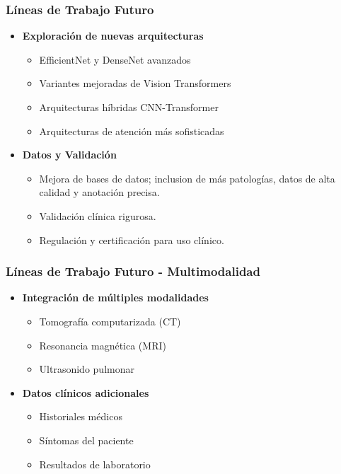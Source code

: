 \begin{frame}
\frametitle{Líneas de Trabajo Futuro}
\begin{itemize}
    \item \textbf{Exploración de nuevas arquitecturas}
    \begin{itemize}
        \item EfficientNet y DenseNet avanzados
        \item Variantes mejoradas de Vision Transformers
        \item Arquitecturas híbridas CNN-Transformer
        \item Arquitecturas de atención más sofisticadas
    \end{itemize}
    \item \textbf{Datos y Validación}
    \begin{itemize}
        \item Mejora de bases de datos; inclusion de más patologías, datos de alta calidad y anotación precisa.
        \item Validación clínica rigurosa.
        \item Regulación y certificación para uso clínico.
    \end{itemize}
\end{itemize}
\end{frame}

\begin{frame}
\frametitle{Líneas de Trabajo Futuro - Multimodalidad}
\begin{itemize}
    \item \textbf{Integración de múltiples modalidades}
    \begin{itemize}
        \item Tomografía computarizada (CT)
        \item Resonancia magnética (MRI)
        \item Ultrasonido pulmonar
    \end{itemize}
    \item \textbf{Datos clínicos adicionales}
    \begin{itemize}
        \item Historiales médicos
        \item Síntomas del paciente
        \item Resultados de laboratorio
    \end{itemize}
\end{itemize}
\end{frame}

